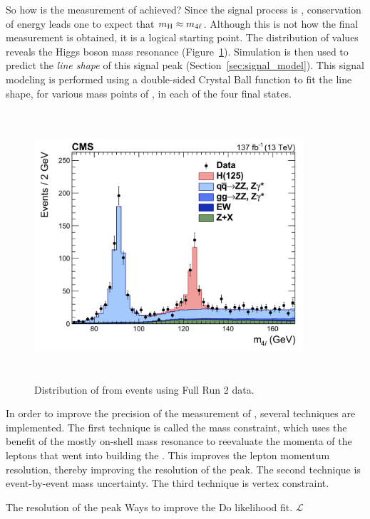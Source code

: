 So how is the measurement of \mH achieved?
Since the signal process is \hzzfourl, conservation of energy leads one to expect that $m_{\mathrm{H}} \approx m_{4\ell}$.
Although this is not how the final measurement is obtained, it is a logical starting point.
The distribution of \mfourl values reveals the Higgs boson mass resonance (Figure~\ref{fig:m4l_run2}).
Simulation is then used to predict the \emph{line shape} of this signal peak (Section~\ref{sec:signal_model}).
This signal modeling is performed using a double-sided Crystal Ball function to fit the line shape, for various mass points of \mH, in each of the four final states.
\begin{figure}[pbth]
    \centering
    \includegraphics[width=10cm,height=10cm,keepaspectratio]{figures/higgsmassmeas/m4l_FullRun2_epjc.jpeg}
        \caption{Distribution of \mfourl from \hzzfourl events using Full Run 2 data.}
        \label{fig:m4l_run2}
\end{figure}

In order to improve the precision of the measurement of \mH, several techniques are implemented.
The first technique is called the \Zone mass constraint, which uses the benefit of the mostly on-shell \Zone mass resonance to reevaluate the momenta of the leptons that went into building the \Zone.
This improves the lepton momentum resolution, thereby improving the resolution of the \mH peak.
The second technique is event-by-event mass uncertainty.
The third technique is vertex constraint.


The resolution of the peak 
Ways to improve the 
Do likelihood fit.
$\mathcal{L}$